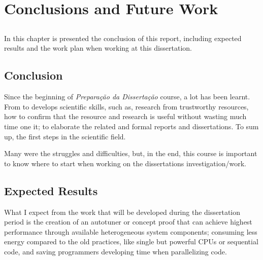 \chapter{Conclusions and Future Work}\label{chap:chap4}

\section*{}

In this chapter is presented the conclusion of this report, including expected results and the work plan when working at this dissertation.

\section{Conclusion}
Since the beginning of \textit{Preparação da Dissertação} course, a lot has been learnt. From to develops scientific skills, such as, research from trustworthy resources, how to confirm that the resource and research is useful without wasting much time one it; to elaborate the related and formal reports and dissertations. To sum up, the first steps in the scientific field.

Many were the struggles and difficulties, but, in the end, this course is important to know where to start when working on the dissertations investigation/work.


\section{Expected Results}

What I expect from the work that will be developed during the dissertation period is the creation of an autotuner or concept proof that can achieve highest performance through available heterogeneous system components; consuming less energy compared to the old practices, like single but powerful CPUs or sequential code,  and saving programmers developing time when parallelizing code.
